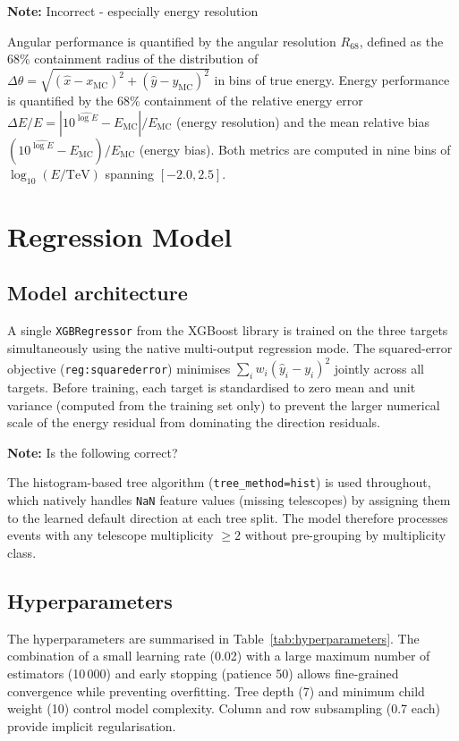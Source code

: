 \documentclass[12pt]{article}
\newcommand{\note}[1]{\begin{noteBox} \textbf{Note:} #1 \end{noteBox}}
\begin{document}
\note{Incorrect - especially energy resolution}

Angular performance is quantified by the angular resolution $R_{68}$,
defined as the 68\% containment radius of the distribution of
$\Delta\theta = \sqrt{(\hat{x} - x_\mathrm{MC})^2 + (\hat{y} - y_\mathrm{MC})^2}$
in bins of true energy.
Energy performance is quantified by the 68\% containment of the relative
energy error $\Delta E / E = |10^{\hat{\log E}} - E_\mathrm{MC}| / E_\mathrm{MC}$
(energy resolution) and the mean relative bias
$(10^{\hat{\log E}} - E_\mathrm{MC}) / E_\mathrm{MC}$ (energy bias).
Both metrics are computed in nine bins of $\log_{10}(E/\mathrm{TeV})$
spanning $[-2.0, 2.5]$.



\section{Regression Model}
\label{sec:regression}

\subsection{Model architecture}

A single \texttt{XGBRegressor} from the XGBoost library \citep{Chen:2016:XST:2939672.2939785}
is trained on the three targets simultaneously using the
native multi-output regression mode.
The squared-error objective (\texttt{reg:squarederror}) minimises
$\sum_i w_i (\hat{y}_i - y_i)^2$ jointly across all targets.
Before training, each target is standardised to zero mean and unit variance
(computed from the training set only) to prevent the larger numerical scale of
the energy residual from dominating the direction residuals.

\note{Is the following correct?}

The histogram-based tree algorithm (\texttt{tree\_method=hist}) is used throughout,
which natively handles \texttt{NaN} feature values (missing telescopes)
by assigning them to the learned default direction at each tree split.
The model therefore processes events with any telescope multiplicity
$\geq 2$ without pre-grouping by multiplicity class.

\subsection{Hyperparameters}

The hyperparameters are summarised in Table~\ref{tab:hyperparameters}.
The combination of a small learning rate (0.02) with a large maximum number of
estimators (10\,000) and early stopping (patience 50) allows fine-grained
convergence while preventing overfitting.
Tree depth (7) and minimum child weight (10) control model complexity.
Column and row subsampling (0.7 each) provide implicit regularisation.
\end{document}

